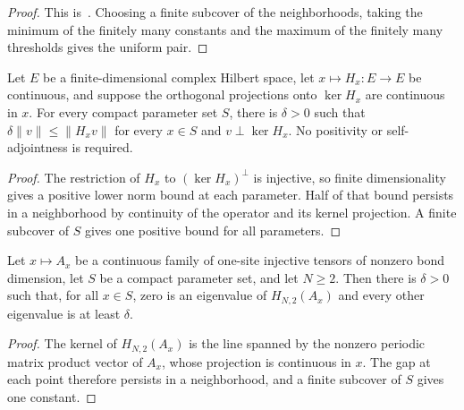 \begin{proof}
    \leanok
    This is~\cite[``Uniform bounds from local bounds on a compact
        set'']{QICLean2026Blueprint}.
    Choosing a finite subcover of the neighborhoods, taking the minimum of the
    finitely many constants and the maximum of the finitely many thresholds
    gives the uniform pair.
\end{proof}

\begin{lemma}
    \label{thm:compact_kernel_gap}
    \leanok
    Let $E$ be a finite-dimensional complex Hilbert space, let
    $x\mapsto H_x\colon E\to E$ be continuous, and suppose the orthogonal
    projections onto $\ker H_x$ are continuous in $x$. For every compact
    parameter set $S$, there is $\delta>0$ such that
    $\delta\lVert v\rVert\leq\lVert H_xv\rVert$ for every $x\in S$ and
    $v\perp\ker H_x$. No positivity or self-adjointness is required.
\end{lemma}

\begin{proof}
    \leanok
    The restriction of $H_x$ to $(\ker H_x)^\perp$ is injective, so finite
    dimensionality gives a positive lower norm bound at each parameter.
    Half of that bound persists in a neighborhood by continuity of the
    operator and its kernel projection. A finite subcover of $S$ gives one
    positive bound for all parameters.
\end{proof}

\begin{lemma}
    \label{thm:periodic_short_gap_continuity}
    \leanok
    Let $x\mapsto A_x$ be a continuous family of one-site injective tensors of
    nonzero bond dimension, let $S$ be a compact parameter set, and let
    $N\geq2$. Then there is $\delta>0$ such that, for all $x\in S$, zero is
    an eigenvalue of $H_{N,2}(A_x)$ and every other eigenvalue is at least
    $\delta$.
\end{lemma}

\begin{proof}
    \leanok
    The kernel of $H_{N,2}(A_x)$ is the line spanned by the nonzero periodic
    matrix product vector of $A_x$, whose projection is continuous in $x$. The
    gap at each point therefore persists in a neighborhood, and a finite
    subcover of $S$ gives one constant.
\end{proof}

